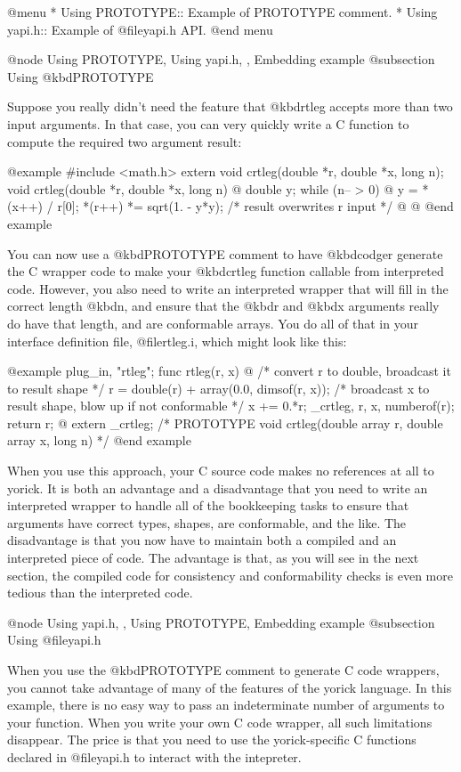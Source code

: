 @menu
* Using PROTOTYPE::             Example of PROTOTYPE comment.
* Using yapi.h::                Example of @file{yapi.h} API.
@end menu

@node Using PROTOTYPE, Using yapi.h, , Embedding example
@subsection Using @kbd{PROTOTYPE}

Suppose you really didn't need the feature that @kbd{rtleg} accepts
more than two input arguments.  In that case, you can very quickly
write a C function to compute the required two argument result:

@example
#include <math.h>
extern void crtleg(double *r, double *x, long n);
void
crtleg(double *r, double *x, long n)
@{
  double y;
  while (n-- > 0) @{
    y = *(x++) / r[0];
    *(r++) *= sqrt(1. - y*y);  /* result overwrites r input */
  @}
@}
@end example

You can now use a @kbd{PROTOTYPE} comment to have @kbd{codger}
generate the C wrapper code to make your @kbd{crtleg} function
callable from interpreted code.  However, you also need to write an
interpreted wrapper that will fill in the correct length @kbd{n}, and
ensure that the @kbd{r} and @kbd{x} arguments really do have that
length, and are conformable arrays.  You do all of that in your
interface definition file, @file{rtleg.i}, which might look like this:

@example
plug_in, "rtleg";
func rtleg(r, x)
@{
  /* convert r to double, broadcast it to result shape */
  r = double(r) + array(0.0, dimsof(r, x));
  /* broadcast x to result shape, blow up if not conformable */
  x += 0.*r;
  _crtleg, r, x, numberof(r);
  return r;
@}
extern _crtleg;
/* PROTOTYPE
   void crtleg(double array r, double array x, long n)
 */
@end example

When you use this approach, your C source code makes no references at
all to yorick.  It is both an advantage and a disadvantage that you
need to write an interpreted wrapper to handle all of the bookkeeping
tasks to ensure that arguments have correct types, shapes, are
conformable, and the like.  The disadvantage is that you now have to
maintain both a compiled and an interpreted piece of code.  The
advantage is that, as you will see in the next section, the compiled
code for consistency and conformability checks is even more tedious
than the interpreted code.

@node Using yapi.h,  , Using PROTOTYPE, Embedding example
@subsection Using @file{yapi.h}

When you use the @kbd{PROTOTYPE} comment to generate C code wrappers,
you cannot take advantage of many of the features of the yorick
language.  In this example, there is no easy way to pass an
indeterminate number of arguments to your function.  When you write
your own C code wrapper, all such limitations disappear.  The price is
that you need to use the yorick-specific C functions declared in
@file{yapi.h} to interact with the intepreter.


